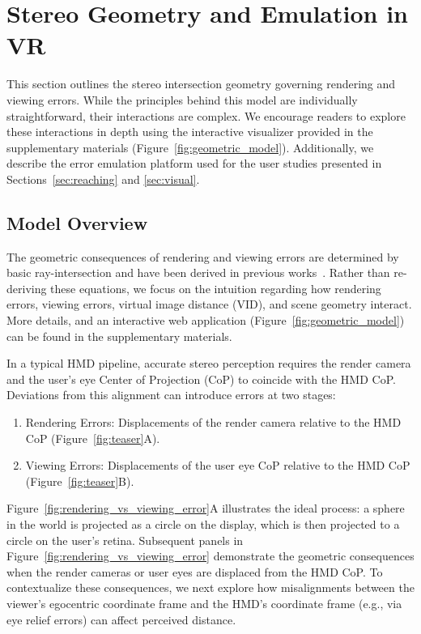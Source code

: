\section{Stereo Geometry and Emulation in VR}
\label{sec:model}
This section outlines the stereo intersection geometry governing rendering and viewing errors. While the principles behind this model are individually straightforward, their interactions are complex. We encourage readers to explore these interactions in depth using the interactive visualizer provided in the supplementary materials (Figure~\ref{fig:geometric_model}). Additionally, we describe the error emulation platform used for the user studies presented in Sections~\ref{sec:reaching} and \ref{sec:visual}.

\subsection{Model Overview}
\label{sec:model overview}
The geometric consequences of rendering and viewing errors are determined by basic ray-intersection and have been derived in previous works~\cite{held2008misperceptions, woods93, rolland04,holloway1997}. Rather than re-deriving these equations, we focus on the intuition regarding how rendering errors, viewing errors, virtual image distance (VID), and scene geometry interact. More details, and an interactive web application (Figure~\ref{fig:geometric_model}) can be found in the supplementary materials.

In a typical HMD pipeline, accurate stereo perception requires the render camera and the user's eye Center of Projection (CoP) to coincide with the HMD CoP. Deviations from this alignment can introduce errors at two stages:

\begin{enumerate}
    \item Rendering Errors: Displacements of the render camera relative to the HMD CoP (Figure~\ref{fig:teaser}A).
    \item Viewing Errors: Displacements of the user eye CoP relative to the HMD CoP (Figure~\ref{fig:teaser}B).
\end{enumerate}

Figure~\ref{fig:rendering_vs_viewing_error}A illustrates the ideal process: a sphere in the world is projected as a circle on the display, which is then projected to a circle on the user's retina. Subsequent panels in Figure~\ref{fig:rendering_vs_viewing_error} demonstrate the geometric consequences when the render cameras or user eyes are displaced from the HMD CoP. To contextualize these consequences, we next explore how misalignments between the viewer's egocentric coordinate frame and the HMD's coordinate frame (e.g., via eye relief errors) can affect perceived distance.

